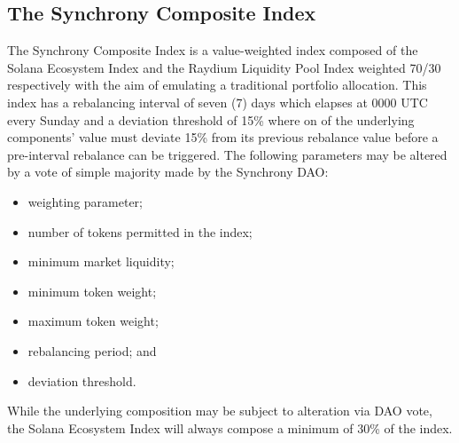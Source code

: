 \documentclass[10pt]{article}
\begin{document}
					\subsection{The Synchrony Composite Index}
					The Synchrony Composite Index is a value-weighted index composed of the Solana
					Ecosystem Index and the Raydium Liquidity Pool Index weighted 70/30 respectively
					with the aim of emulating a traditional portfolio allocation. This index has
					a rebalancing interval of seven (7) days which elapses at 0000 UTC every Sunday
					and a deviation threshold of 15\% where on of the underlying components' value
					must deviate 15\% from its previous rebalance value before a pre-interval
					rebalance can be triggered. The following parameters may be altered by a vote
					of simple majority made by the Synchrony DAO:
					\begin{itemize}
						\item weighting parameter;
						\item number of tokens permitted in the index;
						\item minimum market liquidity;
						\item minimum token weight;
						\item maximum token weight;
						\item rebalancing period; and
						\item deviation threshold.
					\end{itemize}

					While the underlying composition may be subject to alteration via DAO vote, the
					Solana Ecosystem Index will always compose a minimum of 30\% of the index.
\end{document}
